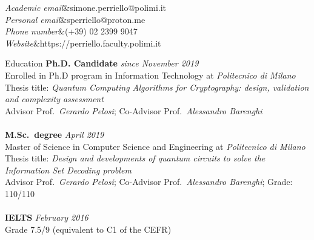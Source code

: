 \documentclass[
	a4paper, %
	11pt, %
]{resume} %
\newenvironment{mytabular}
  {\trivlist\item
    \tabular{ll}}
  {\endtabular\endtrivlist}
\newcommand{\row}[2]{\textit{#1}&#2\\}
\newif\ifpublic{}
\begin{document}
\ifpublic{%
    \begin{mytabular}
      \row{Academic email}{simone.perriello@polimi.it}
    \end{mytabular}%
  }
\else{%
    \begin{mytabular}
      \row{Academic email}{simone.perriello@polimi.it}
      \row{Personal email}{sperriello@proton.me}
      \row{Phone number}{(+39) 02 2399 9047}
      \row{Website}{https://perriello.faculty.polimi.it}
    \end{mytabular}%
  }
\fi

\begin{rSection}{Education}
\textbf{Ph.D. Candidate} \hfill \textit{since November 2019}
\\ Enrolled in Ph.D program in Information Technology at \emph{Politecnico di Milano}
\\ Thesis title: \textit{Quantum Computing Algorithms for Cryptography: design, validation and complexity assessment}
\\ Advisor Prof.\ \textit{Gerardo Pelosi}; Co-Advisor Prof.\ \textit{Alessandro Barenghi}
\\
\\
\textbf{M.Sc.\ degree} \hfill \textit{April 2019}
\\ Master of Science in Computer Science and Engineering at \emph{Politecnico di Milano}
\\ Thesis title: \textit{Design and developments of quantum circuits to solve the Information Set Decoding problem}
\\ Advisor Prof.\ \textit{Gerardo Pelosi}; Co-Advisor Prof.\ \textit{Alessandro Barenghi}; Grade: 110/110
\\
\\
\textbf{IELTS} \hfill \textit{February 2016}
\\ Grade 7.5/9 (equivalent to C1 of the CEFR)
\\
\end{rSection}
\end{document}
